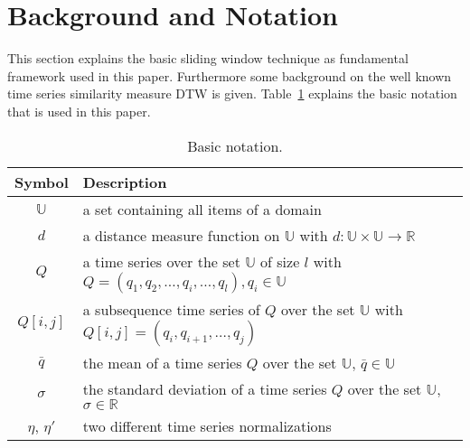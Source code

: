 \section{Background and Notation} \label{background_and_notation}
This section explains the basic sliding window technique as fundamental framework used in this paper. Furthermore some
background on the well known time series similarity measure DTW is given. Table~\ref{tab:notation} explains the basic
notation that is used in this paper.

\begin{table}
    \begin{center}
        \begin{tabularx}{\textwidth}{c X}
            \hline
            \textbf{Symbol} \qquad & \textbf{Description}\\
            \hline
            $\mathbb{U}$ & a set containing all items of a domain\\
            $d$ & a distance measure function on $\mathbb{U}$ with $d: \mathbb{U} \times \mathbb{U} \to \mathbb{R}$\\
            $Q$ & a time series over the set $\mathbb{U}$ of size $l$ with
                $Q = (q_1, q_2, \dots, q_i, \dots, q_l), q_i \in \mathbb{U}$\\
            $Q[i,j]$ & a subsequence time series of $Q$ over the set $\mathbb{U}$ with
                $Q[i,j] = (q_i, q_{i+1}, \dots, q_{j})$\\
            $\bar{q}$ & the mean of a time series $Q$ over the set $\mathbb{U}$, $\bar{q} \in \mathbb{U}$\\
            $\sigma$ & the standard deviation of a time series $Q$ over the set $\mathbb{U}$, $\sigma \in \mathbb{R}$\\
            $\eta$, $\eta '$  & two different time series normalizations\\
            \hline
        \end{tabularx}
    \end{center}
    \caption{Basic notation.}
	\label{tab:notation}
\end{table}



